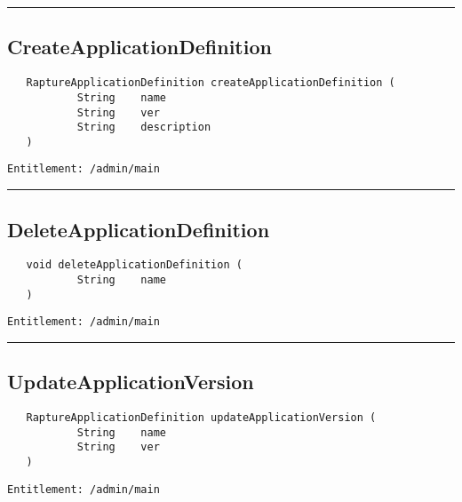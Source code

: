 \rule{12cm}{2pt}
\subsection{CreateApplicationDefinition}
\label{Api:CreateApplicationDefinition}
\begin{verbatim}
   RaptureApplicationDefinition createApplicationDefinition (
           String    name
           String    ver
           String    description
   )
\end{verbatim}
\begin{Verbatim}[fontsize=\small, formatcom=\color{Maroon}]
  Entitlement: /admin/main
\end{Verbatim}



\rule{12cm}{2pt}
\subsection{DeleteApplicationDefinition}
\label{Api:DeleteApplicationDefinition}
\begin{verbatim}
   void deleteApplicationDefinition (
           String    name
   )
\end{verbatim}
\begin{Verbatim}[fontsize=\small, formatcom=\color{Maroon}]
  Entitlement: /admin/main
\end{Verbatim}



\rule{12cm}{2pt}
\subsection{UpdateApplicationVersion}
\label{Api:UpdateApplicationVersion}
\begin{verbatim}
   RaptureApplicationDefinition updateApplicationVersion (
           String    name
           String    ver
   )
\end{verbatim}
\begin{Verbatim}[fontsize=\small, formatcom=\color{Maroon}]
  Entitlement: /admin/main
\end{Verbatim}



